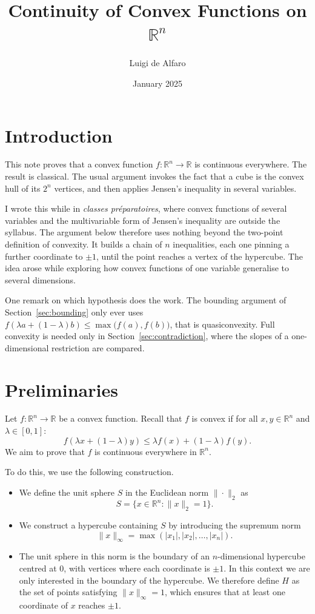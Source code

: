 \documentclass[11pt,a4paper]{article}
\title{Continuity of Convex Functions on $\mathbb{R}^n$}
\author{Luigi de Alfaro}
\date{January 2025}
\begin{document}
\maketitle

\section{Introduction}

This note proves that a convex function $f : \mathbb{R}^n \to \mathbb{R}$ is
continuous everywhere. The result is classical. The usual argument invokes the
fact that a cube is the convex hull of its $2^n$ vertices, and then applies
Jensen's inequality in several variables.

I wrote this while in \emph{classes préparatoires}, where convex functions of
several variables and the multivariable form of Jensen's inequality are outside
the syllabus. The argument below therefore uses nothing beyond the two-point
definition of convexity. It builds a chain of $n$ inequalities, each one pinning
a further coordinate to $\pm 1$, until the point reaches a vertex of the
hypercube. The idea arose while exploring how convex functions of one variable
generalise to several dimensions.

One remark on which hypothesis does the work. The bounding argument of
Section~\ref{sec:bounding} only ever uses
$f(\lambda a + (1-\lambda) b) \le \max\big(f(a), f(b)\big)$, that is
quasiconvexity. Full convexity is needed only in Section~\ref{sec:contradiction},
where the slopes of a one-dimensional restriction are compared.

\section{Preliminaries}

Let $f : \mathbb{R}^n \to \mathbb{R}$ be a convex function. Recall that $f$ is
convex if for all $x, y \in \mathbb{R}^n$ and $\lambda \in [0,1]$:
\[
  f(\lambda x + (1-\lambda) y) \le \lambda f(x) + (1-\lambda) f(y).
\]
We aim to prove that $f$ is continuous everywhere in $\mathbb{R}^n$.

To do this, we use the following construction.

\begin{itemize}
  \item We define the unit sphere $S$ in the Euclidean norm $\|\cdot\|_2$ as
  \[
    S = \{ x \in \mathbb{R}^n : \|x\|_2 = 1 \}.
  \]
  \item We construct a hypercube containing $S$ by introducing the supremum norm
  \[
    \|x\|_\infty = \max(|x_1|, |x_2|, \dots, |x_n|).
  \]
  \item The unit sphere in this norm is the boundary of an $n$-dimensional
  hypercube centred at $0$, with vertices where each coordinate is $\pm 1$. In
  this context we are only interested in the boundary of the hypercube. We
  therefore define $H$ as the set of points satisfying $\|x\|_\infty = 1$, which
  ensures that at least one coordinate of $x$ reaches $\pm 1$.
\end{itemize}
\end{document}

